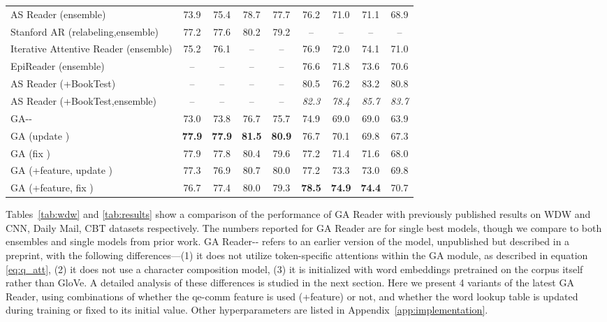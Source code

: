 \documentclass[11pt,a4paper]{article}
\begin{document}
\begin{table*}[ht]
\begin{tabular}{@{}l|cc|cc|cc|cc@{}}
AS Reader (ensemble)                   & 73.9                     & 75.4                      & 78.7                     & 77.7             & 76.2                  & 71.0                   & 71.1                  & 68.9                  \\ 
Stanford AR (relabeling,ensemble) 	& 	77.2	&	77.6	&	80.2	&	79.2	&	--	&	--	&	--	&	--	\\ 
Iterative Attentive Reader (ensemble) 	&	75.2	&	76.1	&	--	&	--	&	76.9	&	72.0	&	74.1	&	71.0 \\ 
EpiReader (ensemble) 	&	--	&	--	&	--	&	--	&	76.6	&	71.8	&	73.6	&	70.6 \\ \midrule
AS Reader (+BookTest)   &	--	&	--	&	--	&	--	&	80.5	&	76.2	&	83.2	&	80.8	\\
AS Reader (+BookTest,ensemble)   &	--	&	--	&	--	&	--	&	\textit{82.3}	&	\textit{78.4}	&	\textit{85.7}	&	\textit{83.7}	\\ \midrule
GA-{}-   & 73.0   & 73.8    & 76.7     & 75.7    & 74.9     & 69.0  & 69.0      & 63.9         \\
GA (update )	&	\textbf{77.9}	&	\textbf{77.9}	&	\textbf{81.5}	&	\textbf{80.9}	&	76.7	&	70.1	&	69.8	&	67.3	\\
GA (fix )	&	77.9	&	77.8	&	80.4	&	79.6	&	77.2	&	71.4	&	71.6	&	68.0	\\
GA (+feature, update )	&	77.3	&	76.9	&	80.7	&	80.0	&	77.2	&	73.3	&	73.0	&	69.8	\\ 
GA (+feature, fix )	&	76.7	&	77.4	&	80.0	&	79.3	&	\textbf{78.5}	&	\textbf{74.9}	&	\textbf{74.4}	&	70.7	\\ \bottomrule
\end{tabular}
\end{table*}


Tables~\ref{tab:wdw} and \ref{tab:results} show a comparison of the performance of GA Reader with previously published results on WDW and CNN, Daily Mail, CBT datasets respectively. The numbers reported for GA Reader are for single best models, though we compare to both ensembles and single models from prior work. GA Reader-{}- refers to an earlier version of the model, unpublished but described in a preprint,
with the following differences---(1) it does not utilize token-specific attentions within the GA module, as described in equation \eqref{eq:q_att}, (2) it does not use a character composition model, (3) it is initialized with word embeddings pretrained on the corpus itself rather than GloVe. A detailed analysis of these differences is studied in the next section. Here we present 4 variants of the latest GA Reader, using combinations of whether the qe-comm feature is used (+feature) or not, and whether the word lookup table  is updated during training or fixed to its initial value. Other hyperparameters are listed in Appendix~\ref{app:implementation}.
\end{document}
